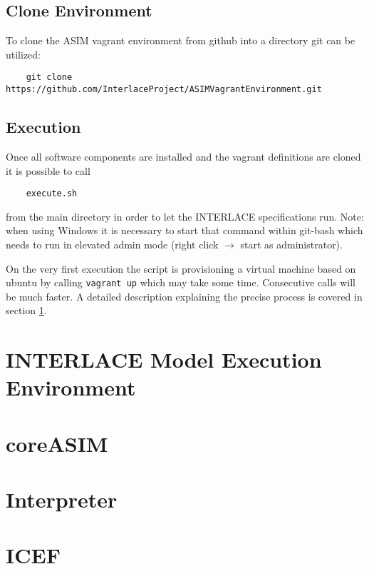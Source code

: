 \subsection{Clone Environment}

To clone the ASIM vagrant environment from github into a directory git can be utilized:

\begin{lstlisting}
	git clone https://github.com/InterlaceProject/ASIMVagrantEnvironment.git
\end{lstlisting}

\subsection{Execution}

Once all software components are installed and the vagrant definitions are cloned it is
possible to call

\begin{lstlisting}
	execute.sh
\end{lstlisting}

from the main directory in order to let the INTERLACE specifications run.
Note: when using Windows it is necessary to start that command within
git-bash which needs to run in elevated admin mode (right click $\rightarrow$
start as administrator).

On the very first execution the script is provisioning a virtual machine based on ubuntu by calling \texttt{vagrant up} which may take some time. Consecutive calls will be much faster. A detailed description explaining the precise process is covered in section \ref{sec:env-exec}.

\section{INTERLACE Model Execution Environment}
\label{sec:env-exec}



\section{coreASIM}

\section{Interpreter}

\section{ICEF}

